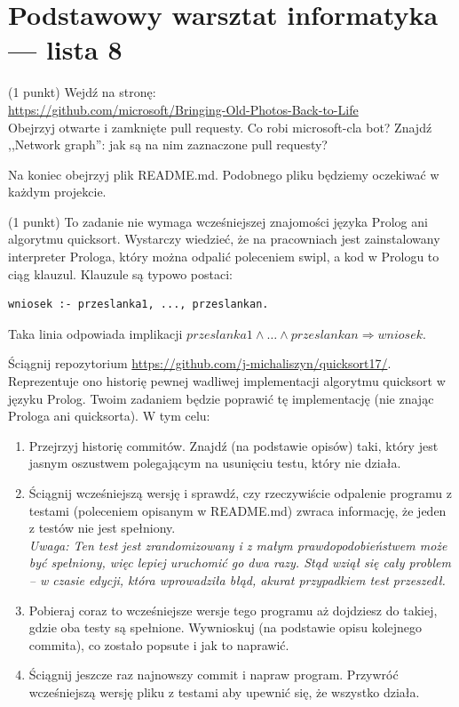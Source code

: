 
 \pagestyle{plain}





\setcounter{section}{1}
\section*{Podstawowy warsztat informatyka --- lista 8}
\begin{zadanie} (1 punkt)
Wejdź na stronę:\\ \url{https://github.com/microsoft/Bringing-Old-Photos-Back-to-Life}\\ Obejrzyj otwarte i zamknięte pull requesty. Co robi microsoft-cla bot? Znajdź ,,Network graph'': jak są na nim zaznaczone pull requesty? 

Na koniec obejrzyj plik README.md. Podobnego pliku będziemy oczekiwać w każdym projekcie.
\end{zadanie}

\begin{zadanie} (1 punkt) To zadanie nie wymaga wcześniejszej znajomości języka Prolog ani algorytmu quicksort. Wystarczy wiedzieć, że na pracowniach jest zainstalowany interpreter Prologa, który można odpalić poleceniem swipl,
a kod w Prologu to ciąg klauzul. Klauzule są typowo postaci:
\begin{verbatim}
wniosek :- przeslanka1, ..., przeslankan.
\end{verbatim}
Taka linia odpowiada implikacji $przeslanka1 \wedge \dots \wedge przeslankan \Rightarrow wniosek$.

Ściągnij repozytorium \url{https://github.com/j-michaliszyn/quicksort17/}. Reprezentuje ono historię pewnej wadliwej implementacji algorytmu quicksort w języku Prolog. Twoim zadaniem będzie poprawić tę implementację (nie znając Prologa ani quicksorta). W tym celu:
\begin{enumerate}
\item Przejrzyj historię commitów. Znajdź (na podstawie opisów) taki, który jest jasnym oszustwem polegającym na usunięciu testu, który nie działa.
\item Ściągnij wcześniejszą wersję i sprawdź, czy rzeczywiście odpalenie programu z testami (poleceniem opisanym w README.md) zwraca informację, że jeden z testów nie jest spełniony.\\
\emph{Uwaga: Ten test jest zrandomizowany i z małym prawdopodobieństwem może być spełniony, więc lepiej uruchomić go dwa razy. Stąd wziął się cały problem -- w czasie edycji, która wprowadziła błąd, akurat przypadkiem test przeszedł.}
\item Pobieraj coraz to wcześniejsze wersje tego programu aż dojdziesz do takiej, gdzie oba testy są spełnione. Wywnioskuj (na podstawie opisu kolejnego commita), co zostało popsute i jak to naprawić.
\item Ściągnij jeszcze raz najnowszy commit i napraw program. Przywróć wcześniejszą wersję pliku z testami aby upewnić się, że wszystko działa.
\end{enumerate}
\end{zadanie}

